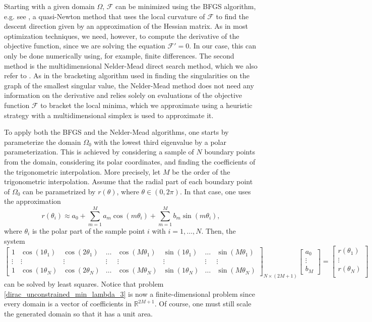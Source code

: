Starting with a given domain \(\Omega\), \(\mathcal{F}\) can be minimized using the \ac{BFGS} algorithm, e.g. see \cite{andrei2022modern}, a quasi-Newton method that uses the local curvature of \(\mathcal{F}\) to find the descent direction given by an approximation of the Hessian matrix. As in most optimization techniques, we need, however, to compute the derivative of the objective function, since we are solving the equation \(\mathcal{F}' =0\). In our case, this can only be done numerically using, for example, finite differences. The second method is the multidimensional Nelder-Mead direct search method, which we also refer to \cite{andrei2022modern}. As in the bracketing algorithm used in finding the singularities on the graph of the smallest singular value, the Nelder-Mead method does not need any information on the derivative and relies solely on evaluations of the objective function \(\mathcal{F}\) to bracket the local minima, which we approximate using a heuristic strategy with a multidimensional simplex is used to approximate it.

To apply both the \ac{BFGS} and the Nelder-Mead algorithms, one starts by parameterize the domain \(\Omega_0\) with the lowest third eigenvalue by a polar parameterization. This is achieved by considering a sample of \(N\) boundary points from the domain, considering its polar coordinates, and finding the coefficients of the trigonometric interpolation. More precisely, let \(M\) be the order of the trigonometric interpolation. Assume that the radial part of each boundary point of \(\Omega_0\) can be parametrized by \(r(\theta)\), where \(\theta \in (0, 2\pi)\). In that case, one uses the approximation
\[
    r(\theta_i) \approx a_0 + \sum_{m=1}^{M}a_m \cos(m \theta_i) + \sum_{m=1}^{M}b_m \sin(m \theta_i),
\]
where \(\theta_i\) is the polar part of the sample point \(i\) with \(i=1,\dots,N\). Then, the system
\[
    \begin{bmatrix}
        1 & \cos(1 \theta_1) & \cos(2 \theta_1) & \dots & \cos(M \theta_1) & \sin(1 \theta_1) & \dots & \sin(M \theta_1)\\
        \vdots & \vdots & \vdots & \vdots & \vdots & \vdots & \vdots & \vdots\\
        1 & \cos(1 \theta_N) & \cos(2 \theta_N) & \dots & \cos(M \theta_N) & \sin(1 \theta_N) & \dots & \sin(M \theta_N)
    \end{bmatrix}_{N\times(2M+1)}
    \begin{bmatrix}
        a_0\\
        \vdots\\
        b_M
    \end{bmatrix}
    =
    \begin{bmatrix}
        r(\theta_1)\\
        \vdots\\
        r(\theta_N)\\
    \end{bmatrix}
\]
can be solved by least squares. Notice that problem \eqref{dirac_unconstrained_min_lambda_3} is now a finite-dimensional problem since every domain is a vector of coefficients in \(\mathbb{R}^{2M+1}\). Of course, one must still scale the generated domain so that it has a unit area.

